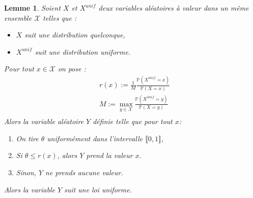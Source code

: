 \documentclass[12pt]{article}
\theoremstyle{plain}
\newtheorem{lemme}[thm]{Lemme}
\theoremstyle{definition}
\begin{document}
\begin{lemme}\label{rejet} Soient $X$ et $X^{unif}$ deux variables aléatoires à valeur dans un même ensemble $\mathcal{X}$ telles que :
\begin{itemize}
\item $X$ suit une distribution quelconque,
\item $X^{unif}$ suit une distribution uniforme.
\end{itemize} 
Pour tout $x \in \mathcal{X}$ on pose :
\begin{equation*}
   \begin{split}
    &r(x) := \frac{1}{M} \frac{\mathbb{P}(X^{unif}=x)}{\mathbb{P}(X=x)} \\[0.6cm]
    &M := \max_{y \in \mathcal{X}}\frac{\mathbb{P}(X^{unif}=y)}{\mathbb{P}(X=y)}\\[0.6cm]
    \end{split}
\end{equation*}
Alors la variable aléatoire $Y$ définie telle que pour tout $x$:
\begin{enumerate}
\item On tire $\theta$ uniformément dans l'intervalle $\llbracket 0,1 \rrbracket$,
\item Si $\theta \leq r(x)$, alors $Y$ prend la valeur $x$.
\item Sinon, $Y$ ne prends aucune valeur.
\end{enumerate}
Alors la variable $Y$ suit une loi uniforme. 
\end{lemme}
\end{document}
